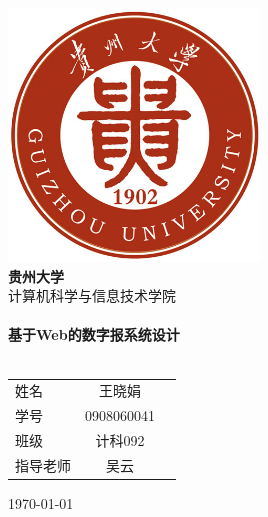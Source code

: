 
\begin{titlepage}
\begin{center}

\includegraphics[width=0.5\textwidth]{./images/university-logo}\\[1cm]
\textbf{\Huge 贵州大学}\\[1cm]
\textsc{\Large 计算机科学与信息技术学院}\\[1.5cm]

\HRule\\[0.4cm]
\textbf{\Huge 基于Web的数字报系统设计}\\[0.4cm]
\HRule\\[1.5cm]

\begin{tabular}{ l c r }
  姓名 & 王晓娟 \\[0.2cm]
  学号 & 0908060041 \\[0.2cm]
  班级 & 计科092 \\[0.2cm]
  指导老师 & 吴云 \\[0.2cm]
\end{tabular}

\vfill

{\Large \today}

\end{center}
\end{titlepage}